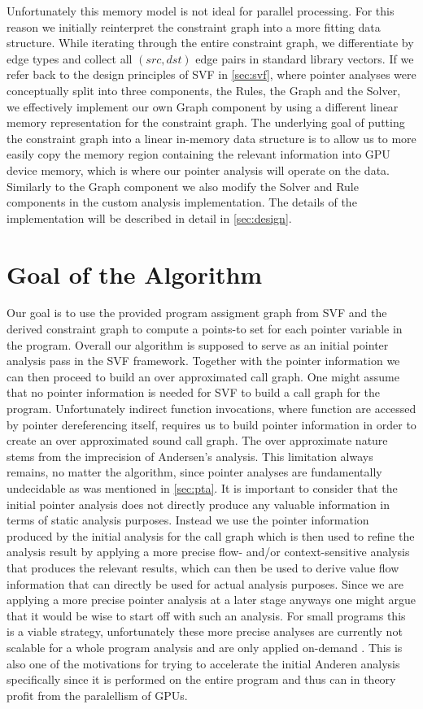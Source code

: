 Unfortunately this memory model is not ideal for parallel processing.
For this reason we initially reinterpret the constraint graph into a more fitting data structure.
While iterating through the entire constraint graph, we differentiate by edge types and collect all $(src,dst)$ edge pairs in standard library vectors.
If we refer back to the design principles of SVF in \autoref{sec:svf}, where pointer analyses were conceptually split into three components, the Rules, the Graph and the Solver, we effectively implement our own Graph component by using a different linear memory representation for the constraint graph. 
The underlying goal of putting the constraint graph into a linear in-memory data structure is to allow us to more easily copy the memory region containing the relevant information into GPU device memory, which is where our pointer analysis will operate on the data.
Similarly to the Graph component we also modify the Solver and Rule components in the custom analysis implementation.
The details of the implementation will be described in detail in \autoref{sec:design}.

\section{Goal of the Algorithm}
Our goal is to use the provided program assigment graph from SVF and the derived constraint graph to compute a points-to set for each pointer variable in the program.
Overall our algorithm is supposed to serve as an initial pointer analysis pass in the SVF framework. Together with the pointer information we can then proceed to build an over approximated call graph.
One might assume that no pointer information is needed for SVF to build a call graph for the program. Unfortunately indirect function invocations, where function are accessed by pointer dereferencing itself, requires us to build pointer information in order to create an over approximated sound call graph. The over approximate nature stems from the imprecision of Andersen's analysis. This limitation always remains, no matter the algorithm, since pointer analyses are fundamentally undecidable as was mentioned in \autoref{sec:pta}.
It is important to consider that the initial pointer analysis does not directly produce any valuable information in terms of static analysis purposes. Instead we use the pointer information produced by the initial analysis for the call graph which is then used to refine the analysis result by applying a more precise flow- and/or context-sensitive analysis that produces the relevant results, which can then be used to derive value flow information that can directly be used for actual analysis purposes.
Since we are applying a more precise pointer analysis at a later stage anyways one might argue that it would be wise to start off with such an analysis. For small programs this is a viable strategy, unfortunately these more precise analyses are currently not scalable for a whole program analysis and are only applied on-demand \cite{sui2016svf}. This is also one of the motivations for trying to accelerate the initial Anderen analysis specifically since it is performed on the entire program and thus can in theory profit from the paralellism of GPUs.

